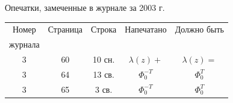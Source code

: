 




\setcounter{page}{90}


\pagestyle{plain}





\bigskip





\centerline{Опечатки, замеченные в журнале за 2003 г.}





\bigskip


\begin{center}


\begin{tabular}{|c|c|c|c|c|}









\hline


Номер & Страница & Строка & Напечатано & Должно быть \\


журнала & & & & \\


\hline


3 & 60 & 10 сн. & $\lambda(z)+$ & $\lambda(z)=$ \\[1mm]


3 & 64 & 13 св. & $\Phi^{-T}_0$ & $\Phi^{T}_0$ \\[1mm]


3 & 65 & 3 св. & $\Phi^{-T}_0$ & $\Phi^{T}_0$ \\


\hline


\end{tabular}


\end{center}











